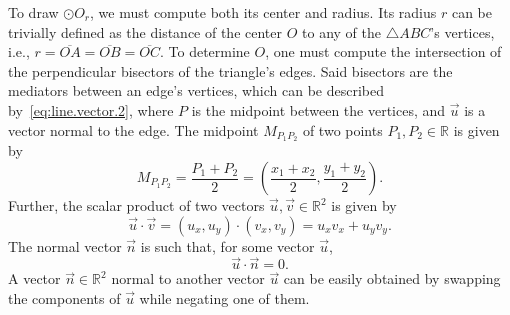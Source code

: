 \begin{comment}
Let $A \in \mathbb{R}^{2 \times 2}$ be the matrix whose columns are the vectors
$\vec{AB} = (a, b)$ and $\vec{AC} = (c, d)$, for instance, such that
%
\begin{equation}\label{eq:matrix.det.2x2}
  \det(A) = \begin{vmatrix}
              a & c\\
              b & d
            \end{vmatrix}%
          = ad - cb
\end{equation}
% 
If the determinant is found to be $0$, then there is no possible solution.
Otherwise, one can proceed to draw $\odot O_r$.
\end{comment}

To draw $\odot O_r$, we must compute both its center and radius.  Its radius $r$
can be trivially defined as the distance of the center $O$ to any of the
$\triangle ABC$'s vertices, i.e., $r = \overline{OA} = \overline{OB} =
\overline{OC}$.  To determine $O$, one must compute the intersection of the
perpendicular bisectors of the triangle's edges.  Said bisectors are the
mediators between an edge's vertices, which can be described
by~\eqref{eq:line.vector.2}, where $P$ is the midpoint between the vertices, and
$\vec{u}$ is a vector normal to the edge.  The midpoint $M_{P_1P_2}$ of two
points $P_1, P_2 \in \mathbb{R}$ is given by
\begin{equation}\label{eq:midpoint.points.2}
  M_{P_1P_2} = \frac{P_1 + P_2}{2}%
             = (\frac{x_1 + x_2}{2}, \frac{y_1 + y_2}{2}).
\end{equation}
Further, the scalar product of two vectors $\vec{u}, \vec{v} \in \mathbb{R}^2$
is given by
\begin{equation}\label{eq:vector.dot.2}
  \vec{u} \cdot \vec{v} = (u_x, u_y) \cdot (v_x, v_y) = u_x v_x + u_y v_y.
\end{equation}
The normal vector $\vec{n}$ is such that, for some vector $\vec{u}$,
\[
  \vec{u} \cdot \vec{n} = 0.
\]
A vector $\vec{n} \in \mathbb{R}^2$ normal to another vector $\vec{u}$ can be
easily obtained by swapping the components of $\vec{u}$ while negating one of
them.

